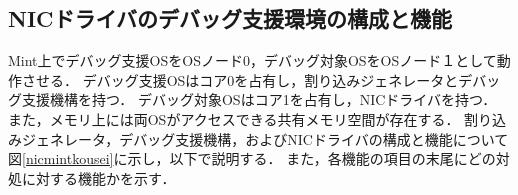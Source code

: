 \documentclass[submit,techreq,noauthor,dvipdfmx]{ipsj}
\begin{document}
\subsection{NICドライバのデバッグ支援環境の構成と機能}\label{sec:structure_and_function_of_DSM_of_NIC_driver}


Mint上でデバッグ支援OSをOSノード0，デバッグ対象OSをOSノード１として動作させる．
デバッグ支援OSはコア0を占有し，割り込みジェネレータとデバッグ支援機構を持つ．
デバッグ対象OSはコア1を占有し，NICドライバを持つ．
また，メモリ上には両OSがアクセスできる共有メモリ空間が存在する．
割り込みジェネレータ，デバッグ支援機構，およびNICドライバの構成と機能について
図\ref{nicmintkousei}に示し，以下で説明する．
また，各機能の項目の末尾にどの対処に対する機能かを示す．
\end{document}
